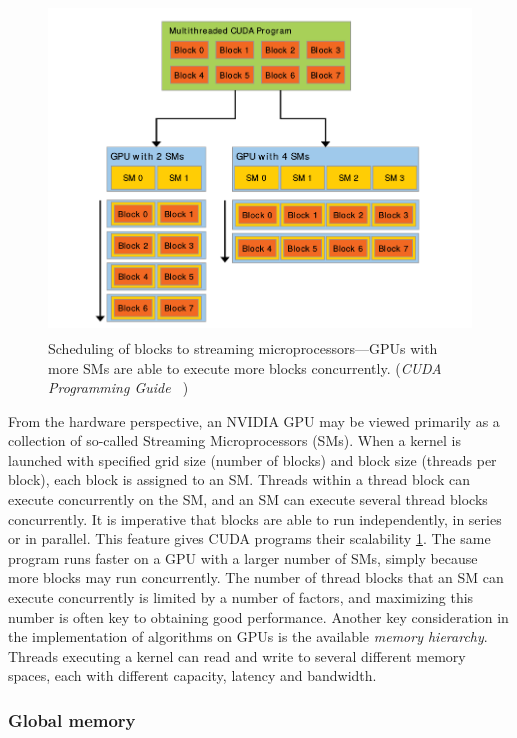 \begin{figure}
\begin{center}
\includegraphics[height=250pt]{img/gpu-scaling.png}
\end{center}
\caption{Scheduling of blocks to streaming microprocessors---GPUs
    with more SMs are able to execute more blocks concurrently.
(\emph{CUDA Programming Guide ~\cite{CUDAProgrammingGuide}})}
\label{fig:gpu-scaling}
\end{figure}

From the hardware perspective,
an NVIDIA GPU may be viewed primarily as
a collection of so-called Streaming Microprocessors (SMs).
When a kernel is launched with specified
grid size (number of blocks)
and block size (threads per block),
each block is assigned to an SM.
Threads within a thread block can execute concurrently on the SM,
and an SM can execute several thread blocks concurrently.
It is imperative that blocks are able to run
independently, in series or in parallel.
This feature gives CUDA programs
their scalability \ref{fig:gpu-scaling}.
The same program runs faster on a GPU with a larger number
of SMs, simply because more blocks may run concurrently.
The number of thread blocks that an
SM can execute concurrently
is limited by a number of factors,
and maximizing this number is often
key to obtaining good performance.
Another key consideration in the implementation
of algorithms on GPUs is the
available \emph{memory hierarchy}.
Threads executing a kernel can read and write
to several different memory spaces,
each with different capacity, latency and bandwidth.

\subsubsection{Global memory}

